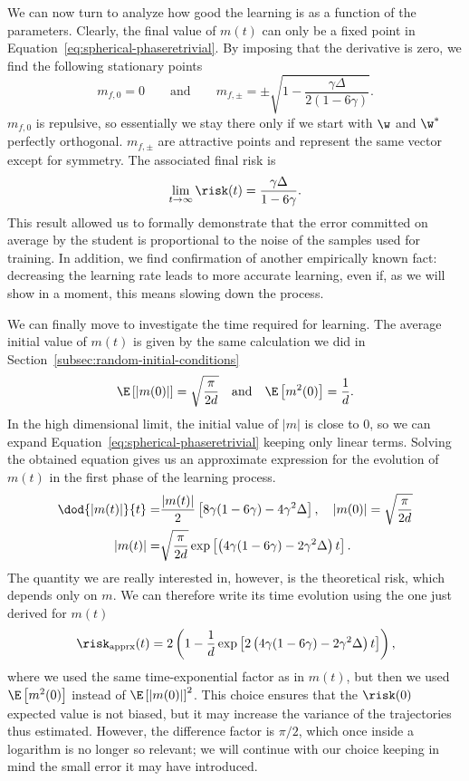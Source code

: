We can now turn to analyze how good the learning is as a function of the parameters.
Clearly, the final value of \(m{(t)}\) can only be a fixed point in Equation~\eqref{eq:spherical-phaseretrivial}.
By imposing that the derivative is zero, we find the following stationary points
\[m_{f,0} = 0 \qquad\text{and}\qquad m_{f,\pm} = \pm\sqrt{1-\frac{\gamma\Delta}{2(1-6\gamma)}}.\]
\(m_{f,0}\) is repulsive, so essentially we stay there only if we start with \(\w\) and \(\w^*\) perfectly orthogonal.
\(m_{f,\pm}\) are attractive points and represent the same vector except for symmetry. The associated final risk is 
\[
  \lim_{t\to\infty}\risk(t) = \frac{\gamma\Delta}{1-6\gamma}.
\]
This result allowed us to formally demonstrate that the error committed on average by the student is proportional to the noise of the samples used for training.
In addition, we find confirmation of another empirically known fact:
decreasing the learning rate leads to more accurate learning, even if, as we will show in a moment,
this means slowing down the process.

We can finally move to investigate the time required for learning. The average initial value of \(m{(t)}\) is given by
the same calculation we did in Section~\ref{subsec:random-initial-conditions}
\[
  \E\left[|m(0)|\right] = \sqrt{\frac{\pi}{2d}}\quad\text{and}\quad
  \E\left[m^2(0)\right] = \frac1d.
\]
In the high dimensional limit, the initial value of \(|m|\) is close to 0, so we can expand Equation~\eqref{eq:spherical-phaseretrivial} keeping only linear terms.
Solving the obtained equation gives us an approximate expression for the evolution of \(m(t)\) in the first phase of the learning process.
\[\begin{split}
  \dod{|m{(t)}|}{t} =& \frac{|m{(t)}|}{2}\left[8\gamma(1-6\gamma)-4\gamma^2\Delta\right], \quad |m{(0)}| = \sqrt{\frac{\pi}{2d}} \\
  |m{(t)}| =& \sqrt{\frac{\pi}{2d}} \exp\left[\left(4\gamma(1-6\gamma)-2\gamma^2\Delta\right)t\right].
\end{split}\]
The quantity we are really interested in, however, is the theoretical risk, which depends only on \(m\).
We can therefore write its time evolution using the one just derived for \(m(t)\)
\[
  \risk_\text{apprx}{(t)} = 2\left(1-\frac1d \exp\left[2\left(4\gamma(1-6\gamma)-2\gamma^2\Delta\right)t\right]\right),
\]
where we used the same time-exponential factor as in \(m{(t)}\), but then we used \(\E\left[m^2(0)\right]\)
instead of \(\E\left[|m(0)|\right]^2\).
This choice ensures that the \(\risk(0)\) expected value is not biased,
but it may increase the variance of the trajectories thus estimated.
However, the difference factor is \(\pi/2\), which once inside a logarithm is no longer so relevant;
we will continue with our choice keeping in mind the small error it may have introduced.

